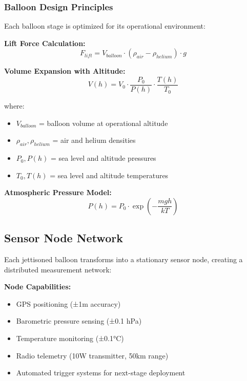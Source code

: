 \documentclass[11pt,a4paper]{article}
\begin{document}
\subsubsection{Balloon Design Principles}

Each balloon stage is optimized for its operational environment:

\textbf{Lift Force Calculation:}
\begin{equation}
F_{lift} = V_{balloon} \cdot (\rho_{air} - \rho_{helium}) \cdot g
\end{equation}

\textbf{Volume Expansion with Altitude:}
\begin{equation}
V(h) = V_0 \cdot \frac{P_0}{P(h)} \cdot \frac{T(h)}{T_0}
\end{equation}

where:
\begin{itemize}
    \item $V_{balloon}$ = balloon volume at operational altitude
    \item $\rho_{air}, \rho_{helium}$ = air and helium densities
    \item $P_0, P(h)$ = sea level and altitude pressures
    \item $T_0, T(h)$ = sea level and altitude temperatures
\end{itemize}

\textbf{Atmospheric Pressure Model:}
\begin{equation}
P(h) = P_0 \cdot \exp\left(-\frac{mgh}{kT}\right)
\end{equation}

\subsection{Sensor Node Network}

Each jettisoned balloon transforms into a stationary sensor node, creating a distributed measurement network:

\textbf{Node Capabilities:}
\begin{itemize}
    \item GPS positioning (±1m accuracy)
    \item Barometric pressure sensing (±0.1 hPa)
    \item Temperature monitoring (±0.1°C)
    \item Radio telemetry (10W transmitter, 50km range)
    \item Automated trigger systems for next-stage deployment
\end{itemize}
\end{document}
